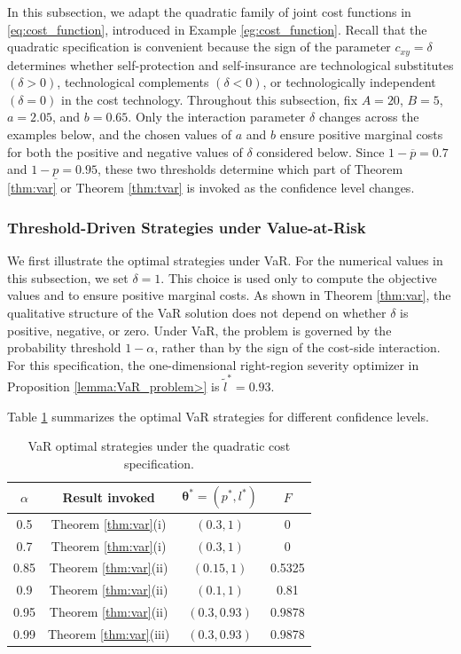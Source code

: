 \documentclass[a4paper,12pt]{article}
\begin{document}
In this subsection, we adapt the quadratic family of joint cost functions in \eqref{eq:cost_function}, introduced in Example \ref{eg:cost_function}. Recall that the quadratic specification is convenient because the sign of the parameter $c_{xy}=\delta$ determines whether self-protection and self-insurance are technological substitutes $\left(\delta>0\right)$, technological complements $\left(\delta<0\right)$, or technologically independent $\left(\delta=0\right)$ in the cost technology. Throughout this subsection, fix $A=20$, $B=5$, $a=2.05$, and $b=0.65$. Only the interaction parameter $\delta$ changes across the examples below, and the chosen values of $a$ and $b$ ensure positive marginal costs for both the positive and negative values of $\delta$ considered below. Since $1-\overline{p}=0.7$ and $1-\underline{p}=0.95$, these two thresholds determine which part of Theorem \ref{thm:var} or Theorem \ref{thm:tvar} is invoked as the confidence level changes.

\subsubsection{Threshold-Driven Strategies under Value-at-Risk}

We first illustrate the optimal strategies under VaR. For the numerical values in this subsection, we set $\delta=1$. This choice is used only to compute the objective values and to ensure positive marginal costs. As shown in Theorem \ref{thm:var}, the qualitative structure of the VaR solution does not depend on whether $\delta$ is positive, negative, or zero. Under VaR, the problem is governed by the probability threshold $1-\alpha$, rather than by the sign of the cost-side interaction. For this specification, the one-dimensional right-region severity optimizer in Proposition \ref{lemma:VaR_problem>} is $\tilde{l}^*=0.93$.

Table \ref{tab:var_illustration} summarizes the optimal VaR strategies for different confidence levels.
\begin{table}[htbp]
\centering
\begin{tabular}{c c c c}
\hline
\(\alpha\) & Result invoked & \({\bm\theta}^*=\left(p^*,l^*\right)\) & $F$ \\
\hline
0.5 & Theorem \ref{thm:var}(i) & \(\left(0.3,1\right)\) & 0 \\
0.7 & Theorem \ref{thm:var}(i) & \(\left(0.3,1\right)\) & 0 \\
0.85 & Theorem \ref{thm:var}(ii) & \(\left(0.15,1\right)\) & 0.5325 \\
0.9 & Theorem \ref{thm:var}(ii) & \(\left(0.1,1\right)\) & 0.81 \\
0.95 & Theorem \ref{thm:var}(ii) & \(\left(0.3,0.93\right)\) & 0.9878 \\
0.99 & Theorem \ref{thm:var}(iii) & \(\left(0.3,0.93\right)\) & 0.9878 \\
\hline
\end{tabular}
\caption{VaR optimal strategies under the quadratic cost specification.}
\label{tab:var_illustration}
\end{table}
\end{document}

